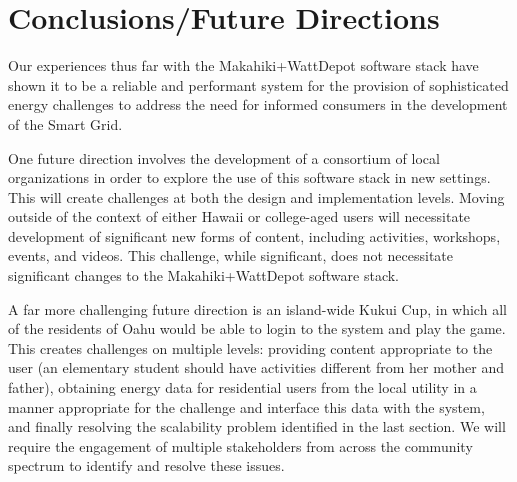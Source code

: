 \section{Conclusions/Future Directions}

Our experiences thus far with the Makahiki+WattDepot software stack have shown it to be a
reliable and performant system for the provision of sophisticated energy challenges to
address the need for informed consumers in the development of the Smart Grid.

One future direction involves the development of a consortium of local organizations in
order to explore the use of this software stack in new settings.  This will create
challenges at both the design and implementation levels.   Moving outside of the context
of either Hawaii or college-aged users will necessitate development of significant new
forms of content, including activities, workshops, events, and videos. This challenge,
while significant, does not necessitate significant changes to the Makahiki+WattDepot
software stack.

A far more challenging future direction is an island-wide Kukui Cup, in which all of the residents of
Oahu would be able to login to the system and play the game. This creates challenges on
multiple levels: providing content appropriate to the user (an elementary student should
have activities different from her mother and father), obtaining energy data for
residential users from the local utility in a manner appropriate for the challenge and
interface this data with the system, and finally resolving the scalability problem
identified in the last section.  We will require the engagement of multiple stakeholders
from across the community spectrum to identify and resolve these issues. 



